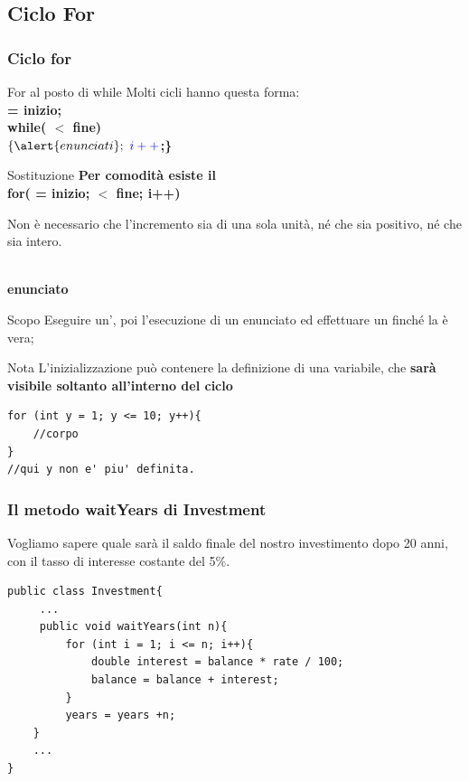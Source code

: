 \subsection*{Ciclo For}
\begin{frame}
\frametitle{Ciclo for}
\begin{block}{For al posto di while}
Molti cicli hanno questa forma:\\
\textbf{ = \alert{inizio;}}\\
\textbf{while( $<$ \alert{fine})}\\
\textbf{$\{ \alert{enunciati}; \mbox{ } \textCl{i++}$;\}}
\end{block}
\begin{block}{Sostituzione}
\textbf{Per comodità esiste il \textbf{}}\\
\hspace{0.7cm}\textbf{for( = \alert{inizio};  $<$ \alert{fine}; i++)}
\end{block}
\begin{block}{}
Non è necessario che l'incremento sia di una sola unità, né che sia positivo, né che sia intero.
\end{block}
\end{frame}

\begin{frame}[fragile]
\begin{block}{}
\textbf{}\\
\hspace{0.7cm} \textbf{\alert{enunciato}}
\end{block}
\begin{block}{Scopo}
Eseguire un'\textbf{}, poi \textbf{} l'esecuzione di un enunciato ed effettuare un 
\textbf{} finché la \textbf{} è vera;
\end{block}
\begin{block}{Nota}
L'inizializzazione può contenere la definizione di una variabile, che \textbf{\alert{sarà visibile soltanto all'interno del ciclo}}
\end{block}
\begin{lstlisting}
for (int y = 1; y <= 10; y++){
    //corpo
}
//qui y non e' piu' definita.
\end{lstlisting}
\end{frame}

\begin{frame}[fragile]
\frametitle{Il metodo waitYears di Investment}
Vogliamo sapere quale sarà il saldo finale del nostro investimento dopo 20 anni, con il tasso di interesse costante del 5\%.
\begin{lstlisting}
public class Investment{
     ...
     public void waitYears(int n){
         for (int i = 1; i <= n; i++){
             double interest = balance * rate / 100;
             balance = balance + interest;
         }
         years = years +n;
    }
    ...
}
\end{lstlisting}
\end{frame}

